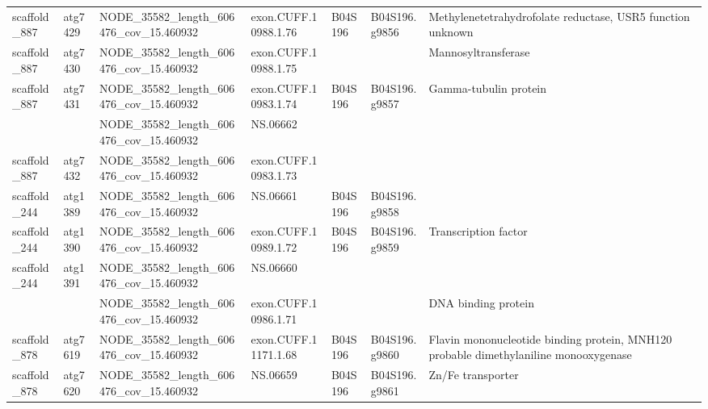 \begin{longtable}{lllllll}
   scaffold\_887 &       atg7429 &  NODE\_35582\_length\_606476\_cov\_15.460932 &  exon.CUFF.10988.1.76 &      B04S196 &  B04S196.g9856 &  Methylenetetrahydrofolate reductase, USR5 function unknown \\
   scaffold\_887 &       atg7430 &  NODE\_35582\_length\_606476\_cov\_15.460932 &  exon.CUFF.10988.1.75 &              &                &                              Mannosyltransferase \\
   scaffold\_887 &       atg7431 &  NODE\_35582\_length\_606476\_cov\_15.460932 &  exon.CUFF.10983.1.74 &      B04S196 &  B04S196.g9857 &                            Gamma-tubulin protein \\
                &               &  NODE\_35582\_length\_606476\_cov\_15.460932 &              NS.06662 &              &                &                                                  \\
   scaffold\_887 &       atg7432 &  NODE\_35582\_length\_606476\_cov\_15.460932 &  exon.CUFF.10983.1.73 &              &                &                                                  \\
   scaffold\_244 &       atg1389 &  NODE\_35582\_length\_606476\_cov\_15.460932 &              NS.06661 &      B04S196 &  B04S196.g9858 &                                                  \\
   scaffold\_244 &       atg1390 &  NODE\_35582\_length\_606476\_cov\_15.460932 &  exon.CUFF.10989.1.72 &      B04S196 &  B04S196.g9859 &                             Transcription factor \\
   scaffold\_244 &       atg1391 &  NODE\_35582\_length\_606476\_cov\_15.460932 &              NS.06660 &              &                &                                                  \\
                &               &  NODE\_35582\_length\_606476\_cov\_15.460932 &  exon.CUFF.10986.1.71 &              &                &                               DNA binding protein \\
   scaffold\_878 &       atg7619 &  NODE\_35582\_length\_606476\_cov\_15.460932 &  exon.CUFF.11171.1.68 &      B04S196 &  B04S196.g9860 &  Flavin mononucleotide binding protein, MNH120 probable dimethylaniline monooxygenase \\
   scaffold\_878 &       atg7620 &  NODE\_35582\_length\_606476\_cov\_15.460932 &              NS.06659 &      B04S196 &  B04S196.g9861 &                                Zn/Fe transporter \\
\end{longtable}
